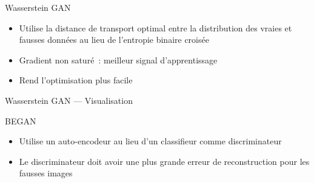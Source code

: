 \begin{frame}{Wasserstein GAN}
  \begin{itemize}[<+->]
    \item Utilise la distance de transport optimal entre la distribution des vraies et fausses données au lieu de l'entropie binaire croisée
    \item Gradient non saturé~: meilleur signal d'apprentissage
    \item Rend l'optimisation plus facile
  \end{itemize}
\end{frame}

\begin{frame}{Wasserstein GAN --- Visualisation}
\end{frame}

\begin{frame}{BEGAN}
  \begin{itemize}[<+->]
    \item Utilise un auto-encodeur au lieu d'un classifieur comme discriminateur
    \item Le discriminateur doit avoir une plus grande erreur de reconstruction pour les fausses images
  \end{itemize}
\end{frame}
